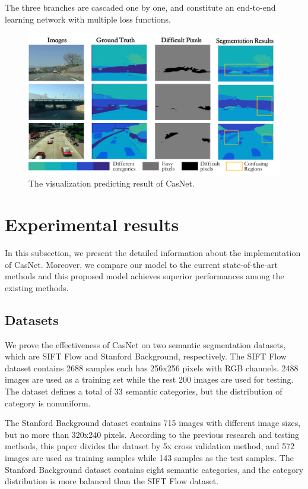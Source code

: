 \documentclass[10.5pt,compsoc]{TsT}
\theoremstyle{mystyle}
\begin{document}
{The three branches are cascaded one by one, and constitute an end-to-end learning network with multiple loss functions.


\begin{figure}[ht]
\centering
\includegraphics[width=1.9\columnwidth]{fig3.png}
\caption{The visualization predicting result of CasNet.}
\label{fig3}
\end{figure} 

\section{Experimental results}
\label{s:results}
\noindent
In this subsection, we present the detailed information about the implementation of CasNet. Moreover, we compare our model to the current state-of-the-art methods and this proposed model achieves superior performances among the existing methods.

\subsection{Datasets}
\noindent
We prove the effectiveness of CasNet on two semantic segmentation datasets, which are SIFT Flow and Stanford Background, respectively. The SIFT Flow dataset contains 2688 samples each has 256x256 pixels with RGB channels. 2488 images are used as a training set while the rest 200 images are used for testing. The dataset defines a total of 33 semantic categories, but the distribution of category is nonuniform.

The Stanford Background dataset contains 715 images with different image sizes, but no more than 320x240 pixels. According to the previous research and testing methods, this paper divides the dataset by 5x cross validation method, and 572 images are used as training samples while 143 samples as the test samples. The Stanford Background dataset contains eight semantic categories, and the category distribution is more balanced than the SIFT Flow dataset.


}
\end{document}
